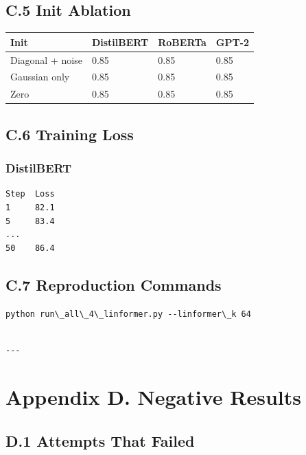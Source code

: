 \subsection{C.5 Init Ablation}

\begin{table}[H]
\centering
\small
\begin{tabular}{llll}
\toprule
\textbf{Init} & \textbf{DistilBERT} & \textbf{RoBERTa} & \textbf{GPT-2} \\
\midrule
Diagonal + noise & 0.85 & 0.85 & 0.85 \\
Gaussian only & 0.85 & 0.85 & 0.85 \\
Zero & 0.85 & 0.85 & 0.85 \\
\bottomrule
\end{tabular}
\end{table}

\subsection{C.6 Training Loss}

\subsubsection{DistilBERT}
\begin{lstlisting}
Step  Loss
1     82.1
5     83.4
...
50    86.4
\end{lstlisting}

\subsection{C.7 Reproduction Commands}

\begin{lstlisting}
python run\_all\_4\_linformer.py --linformer\_k 64
\end{lstlisting}
\begin{lstlisting}

---
\end{lstlisting}

\section{Appendix D. Negative Results}

\subsection{D.1 Attempts That Failed}

